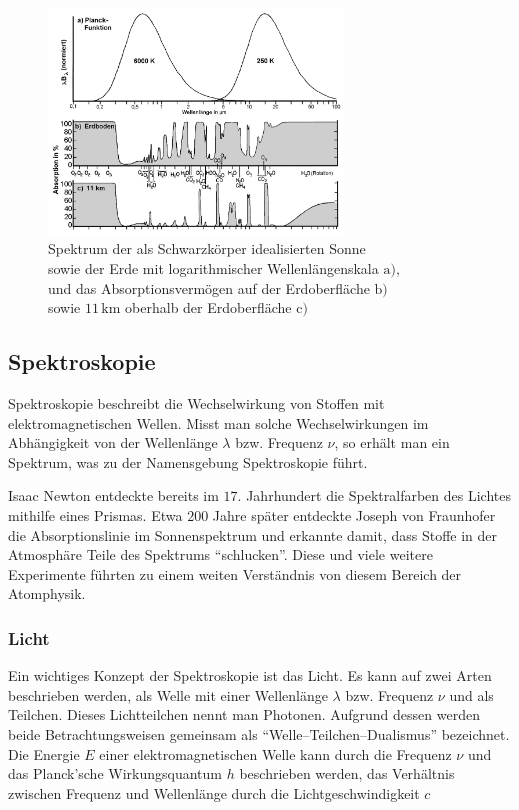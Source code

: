 \documentclass[12pt,a4paper]{scrartcl}
\numberwithin{equation}{section} %
\begin{document}
	\begin{figure}[h!]
		\centering
		\includegraphics[width=0.7\textwidth]{../media/B1.1/Spektrum_Sonne_Erde.png}
		\caption{Spektrum der als Schwarzkörper idealisierten Sonne\\
			sowie der Erde mit logarithmischer Wellenlängenskala $\mathrm a)$,\\
			und das Absorptionsvermögen auf der Erdoberfläche $\mathrm b)$\\
			sowie $11\mathrm{\,km}$ oberhalb der Erdoberfläche $\mathrm c)$ \cite{GoodyYung}}
		\label{abb:Spektrum Sonne & Erde}
	\end{figure}
	
	\subsection{Spektroskopie}
	\label{Spektroskopie}
	Spektroskopie beschreibt die Wechselwirkung von Stoffen mit elektromagnetischen Wellen. Misst man solche Wechselwirkungen im Abhängigkeit von der Wellenlänge $\lambda$ bzw. Frequenz $\nu$, so erhält man ein Spektrum, was zu der Namensgebung Spektroskopie führt.
	
	Isaac Newton entdeckte bereits im $17.$ Jahrhundert die Spektralfarben des Lichtes mithilfe eines Prismas. Etwa $200$ Jahre später entdeckte Joseph von Fraunhofer die Absorptionslinie im Sonnenspektrum und erkannte damit, dass Stoffe in der Atmosphäre Teile des Spektrums ``schlucken''. Diese und viele weitere Experimente führten zu einem weiten Verständnis von diesem Bereich der Atomphysik.
	
	\subsubsection{Licht}
	\label{Licht}
	Ein wichtiges Konzept der Spektroskopie ist das Licht. Es kann auf zwei Arten beschrieben werden, als Welle mit einer Wellenlänge $\lambda$ bzw. Frequenz $\nu$ und als Teilchen. Dieses Lichtteilchen nennt man Photonen. Aufgrund dessen werden beide Betrachtungsweisen gemeinsam als ``Welle--Teilchen--Dualismus'' bezeichnet. Die Energie $E$ einer elektromagnetischen Welle kann durch die Frequenz $\nu$ und das Planck'sche Wirkungsquantum $h$ beschrieben werden, das Verhältnis zwischen Frequenz und Wellenlänge durch die Lichtgeschwindigkeit $c$
	
\end{document}
